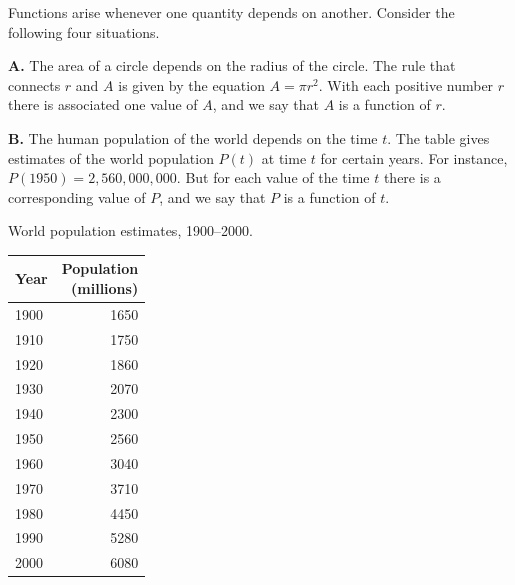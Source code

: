 \documentclass[boxednum]{chapterstart}
\begin{document}


Functions arise whenever one quantity depends on another. Consider the
following four situations.

\textbf{A.} The area of a circle depends on the radius of the circle. The
rule that connects $r$ and $A$ is given by the equation $A = \pi r^2$. With
each positive number $r$ there is associated one value of $A$, and we say
that $A$ is a function of $r$.

\textbf{B.} The human population of the world depends on the time $t$. The
table gives estimates of the world population $P(t)$ at time $t$ for certain
years. For instance, $P(1950) = 2{,}560{,}000{,}000$. But for each value of
the time $t$ there is a corresponding value of $P$, and we say that $P$ is a
function of $t$.

\begin{widetable}[place=margin]
  \caption{World population estimates, 1900--2000.}
  \label{tab:population}
  \begin{tabular*}{\linewidth}{@{\extracolsep{\fill}}lr}
    \toprule
    Year & \shortstack{Population\\(millions)} \\
    \midrule
    1900 & 1650 \\
    1910 & 1750 \\
    1920 & 1860 \\
    1930 & 2070 \\
    1940 & 2300 \\
    1950 & 2560 \\
    1960 & 3040 \\
    1970 & 3710 \\
    1980 & 4450 \\
    1990 & 5280 \\
    2000 & 6080 \\
    \bottomrule
  \end{tabular*}
\end{widetable}
\end{document}
